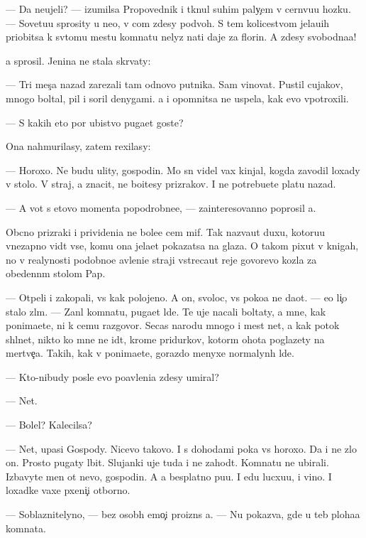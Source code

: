 \documentclass[10pt]{book}
\begin{document}
— Da neujeli? — izumilsa Pro\-po\-ved\-nik i tknul suhim paly{\c}em v cern{\ia}vu{\y}u ho\-z{\ia}{\y}\-ku. — Sovetu{\y}u sprosity u ne{\y}o, v com zdesy podvoh. S tem kolicestvom jela{\y}u{\x}ih priob{\x}itsa k sv{\ia}tomu mestu komnatu nelyz{\ia} na{\y}ti daje za florin. A zdesy svobodna{\y}a!

{\Y}a sprosil. Jen{\x}ina ne stala skr{\yi}vaty:

— Tri mes{\ia}{\c}a nazad zarezali tam odnovo putnika. Sam vinovat. Pustil cujakov, mnogo boltal, pil i soril denygami. {\Y}a i opomnitsa ne uspela, kak {\y}evo v{\yi}potroxili.

— S kakih eto por ubi{\y}stvo puga{\y}et goste{\y}?

Ona nahmurilasy, zatem rexilasy:

— Horoxo. Ne budu {\y}ulity, gospodin. Mo{\y} s{\yi}n videl vax kinjal, kogda zavodil loxady v sto{\y}lo. V{\yi} straj, a znacit, ne bo{\y}itesy prizrakov. I ne potrebu{\y}ete platu nazad.

— A vot s etovo momenta popodrobne{\y}e, — zainteresovanno poprosil {\y}a.

Ob{\yi}cno prizraki i privideni{\y}a ne bole{\y}e cem mif. Tak naz{\yi}va{\y}ut duxu, kotoru{\y}u vnezapno vid{\ia}t vse, komu ona jela{\y}et pokazatsa na glaza. O takom pixut v knigah, no v realynosti po\-dob\-no\-{\y}e {\y}avleni{\y}e straji vstreca{\y}ut reje govor{\ia}{\x}evo kozla za obedenn{\yi}m stolom Pap{\yi}.

— Otpeli i zakopali, vs{\e} kak polojeno. A on, svoloc, vs{\e} poko{\y}a ne da{\y}ot. — {\Y}e{\y}o li{\c}o stalo zl{\yi}m. — Zan{\ia}l komnatu, puga{\y}et l{\io}de{\y}. Te uje nacali boltaty, a mne, kak ponima{\y}ete, ni k cemu razgovor{\yi}. Se{\y}cas narodu mnogo i mest net, a kak potok shl{\yi}net, nikto ko mne ne id{\e}t, krome pridurkov, kotor{\yi}m ohota poglazety na mertve{\c}a. Takih, kak v{\yi} ponima{\y}ete, gorazdo menyxe normalyn{\yi}h l{\io}de{\y}.

— Kto-nibudy posle {\y}evo po{\y}avleni{\y}a zdesy umiral?

— Net.

— Bolel? Kalecilsa?

— Net, upasi Gospody. Nicevo takovo. I s dohodami poka vs{\e} horoxo. Da i ne zlo{\y} on. Prosto pugaty l{\io}bit. Slujanki uje tuda i ne zahod{\ia}t. Komnatu ne ubirali. Izbavyte men{\ia} ot nevo, gospodin. A {\y}a besplatno pu{\x}u. I {\y}edu lucxu{\y}u, i vino. I loxadke vaxe{\y} pxeni{\c}i otborno{\y}.

— Soblaznitelyno, — bez osob{\yi}h emo{\c}i{\y} proizn{\e}s {\y}a. — Nu pokaz{\yi}va{\y}, gde u teb{\ia} ploha{\y}a komnata.
\end{document}
